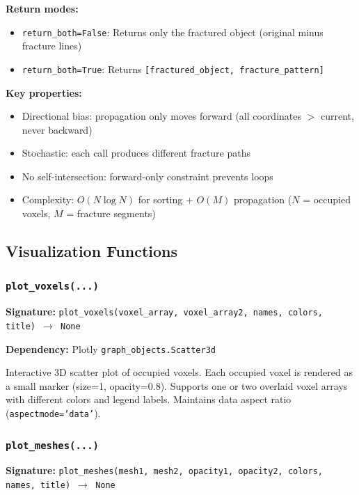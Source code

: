 \documentclass[12pt,a4paper]{article}
\begin{document}
\textbf{Return modes:}
\begin{itemize}
  \item \texttt{return\_both=False}: Returns only the fractured object (original minus fracture lines)
  \item \texttt{return\_both=True}: Returns \texttt{[fractured\_object, fracture\_pattern]}
\end{itemize}

\textbf{Key properties:}
\begin{itemize}
  \item Directional bias: propagation only moves forward (all coordinates $>$ current, never backward)
  \item Stochastic: each call produces different fracture paths
  \item No self-intersection: forward-only constraint prevents loops
  \item Complexity: $O(N \log N)$ for sorting + $O(M)$ propagation ($N$ = occupied voxels, $M$ = fracture segments)
\end{itemize}

\subsection{Visualization Functions}

\subsubsection{\texttt{plot\_voxels(...)}}

\textbf{Signature:} \texttt{plot\_voxels(voxel\_array, voxel\_array2, names, colors, title) $\rightarrow$ None}

\textbf{Dependency:} Plotly \texttt{graph\_objects.Scatter3d}

Interactive 3D scatter plot of occupied voxels. Each occupied voxel is rendered as a small marker (size=1, opacity=0.8). Supports one or two overlaid voxel arrays with different colors and legend labels. Maintains data aspect ratio (\texttt{aspectmode='data'}).

\subsubsection{\texttt{plot\_meshes(...)}}

\textbf{Signature:} \texttt{plot\_meshes(mesh1, mesh2, opacity1, opacity2, colors, names, title) $\rightarrow$ None}
\end{document}
